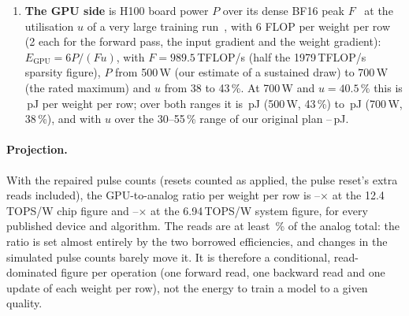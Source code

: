 \begin{enumerate}
      digital TT state below (the storage of $H$, AGAD's averages $p$ and $p^{\mathrm{ref}}$ and their arithmetic, the chopper
      signs, the threshold tests and the transfer scheduling), is outside the ratio.
\item \textbf{The GPU side} is H100 board power $P$ over its dense BF16 peak $F$~\cite{nvidiah100} at the utilisation $u$ of
      a very large training run~\cite{dubey2024}, with 6 FLOP per weight per row (2 each for the forward pass, the input
      gradient and the weight gradient): $E_{\mathrm{GPU}}=6P/(Fu)$, with $F=989.5$\,TFLOP/s (half the 1979\,TFLOP/s
      sparsity figure), $P$ from 500\,W (our estimate of a sustained draw) to 700\,W (the rated maximum) and $u$ from 38 to
      43\,\%. At 700\,W and $u=40.5\,\%$ this is \RVenGpuPj\,pJ per weight per row; over both ranges it is
      \RVenGpuMeasLo\,pJ (500\,W, 43\,\%) to \RVenGpuMeasHi\,pJ (700\,W, 38\,\%), and with $u$ over the 30--55\,\% range of our
      original plan \RVenGpuPlannedLo--\RVenGpuPlannedHi\,pJ.
\end{enumerate}

\paragraph{Projection.} With the repaired pulse counts (resets counted as applied, the pulse reset's extra reads included), the
GPU-to-analog ratio per weight per row is \RVenChipMin--\RVenChipMax$\times$ at the 12.4\,TOPS/W chip figure and
\RVenSysMin--\RVenSysMax$\times$ at the 6.94\,TOPS/W system figure, for every published device and algorithm. The reads are at
least \RVenChipMvmShareMin\,\% of the analog total: the ratio is set almost entirely by the two borrowed efficiencies, and changes in the simulated pulse counts barely move it. It is therefore a conditional, read-dominated figure per
operation (one forward read, one backward read and one update of each weight per row), not the energy to train a model to a
given quality.

